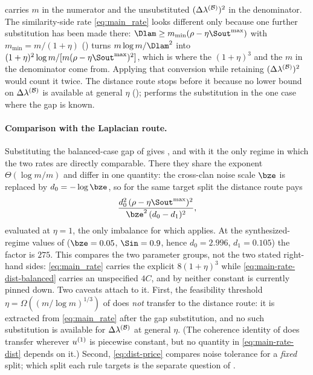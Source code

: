 \begin{remark}\label{rem:dist-normalization}
 carries $m$ in the numerator and the unsubstituted
$(\Delta\lambda^{(\mathcal{B})})^2$ in the denominator. The similarity-side rate \eqref{eq:main_rate}
looks different only because one further substitution has been made there:
$\Dlam\ge m_{\min}(\rho-\eta\Sout^{\max})$ with $m_{\min}=m/(1+\eta)$
() turns $m\log m/\Dlam^{2}$ into
$(1+\eta)^{2}\log m/[m(\rho-\eta\Sout^{\max})^{2}]$, which is where the
$(1+\eta)^{3}$ and the $m$ in the denominator come from. Applying that conversion
while retaining $(\Delta\lambda^{(\mathcal{B})})^2$ would count it twice. The distance route stops
before it because no lower bound on $\Delta\lambda^{(\mathcal{B})}$ is available at general $\eta$
();  performs the substitution in
the one case where the gap is known.
\end{remark}

\paragraph{Comparison with the Laplacian route.}
Substituting the balanced-case gap of  gives
, and with it the only regime in which the two rates are
directly comparable. There they share the exponent $\Theta(\log m/m)$ and differ
in one quantity: the cross-clan noise scale $\bze$ is replaced by
$d_0=-\log\bze$, so for the same target split the distance route pays
\begin{equation}\label{eq:dist-price}
   \frac{d_0^{2}\,(\rho-\eta\Sout^{\max})^{2}}{\bze^{2}\,(d_0-d_1)^{2}},
\end{equation}
evaluated at $\eta=1$, the only imbalance for which
 applies. At the synthesized-regime values of
 ($\bze=0.05$, $\Sin=0.9$, hence $d_0=2.996$, $d_1=0.105$)
the factor is $275$. This compares the two parameter groups, not the two stated
right-hand sides: \eqref{eq:main_rate} carries the explicit $8(1+\eta)^3$ while
\eqref{eq:main-rate-dist-balanced} carries an unspecified $4C$, and by
 neither constant is currently pinned down.
Two caveats attach to it. First, the feasibility threshold
$\eta=\Omega((m/\log m)^{1/3})$ of  does \emph{not} transfer
to the distance route: it is extracted from \eqref{eq:main_rate} after the gap
substitution, and no such substitution is available for $\Delta\lambda^{(\mathcal{B})}$ at general
$\eta$. (The coherence identity of  does transfer wherever
$u^{(1)}$ is piecewise constant, but no quantity in \eqref{eq:main-rate-dist}
depends on it.) Second, \eqref{eq:dist-price} compares noise tolerance for a
\emph{fixed} split; which split each rule targets is the separate question of
.
